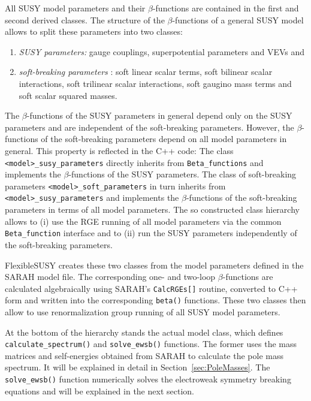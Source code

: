\documentclass[final,3p,11pt,pdflatex]{elsarticle}
\makeatletter
\newcommand{\fs}{FlexibleSUSY\@\xspace}
\newcommand{\code}[1]{\lstinline|#1|}  %
\newcommand{\secref}[1]{Section~\ref{#1}}
\makeatother
\begin{document}
All SUSY model parameters and their $\beta$-functions are contained in
the first and second derived classes.  The structure of the
$\beta$-functions of a general SUSY model
\cite{Jones:1974pg,Jones:1983vk,West:1984dg,Martin:1993yx,Yamada:1993ga,MV94,Fonseca:2011vn,Sperling:2013eva,Sperling:2013xqa}
allows to split these parameters into two classes:
%
\begin{enumerate}
\item \emph{SUSY parameters:} gauge couplings, superpotential
  parameters and VEVs and
\item \emph{soft-breaking parameters} \cite{Girardello:1981wz}: soft
  linear scalar terms, soft bilinear scalar interactions, soft
  trilinear scalar interactions, soft gaugino mass terms and soft
  scalar squared masses.
\end{enumerate}
%
The $\beta$-functions of the SUSY parameters in general depend only on
the SUSY parameters and are independent of the soft-breaking
parameters.  However, the $\beta$-functions of the soft-breaking
parameters depend on all model parameters in general.
%
This property is reflected in the C++ code: The class
\code{<model>_susy_parameters} directly inherits from
\code{Beta_functions} and implements the $\beta$-functions of the SUSY
parameters.  The class of soft-breaking parameters
\code{<model>_soft_parameters} in turn inherits from
\code{<model>_susy_parameters} and implements the $\beta$-functions of
the soft-breaking parameters in terms of all model parameters.  The so
constructed class hierarchy allows to (i) use the RGE running of all
model parameters via the common \code{Beta_function} interface and to
(ii) run the SUSY parameters independently of the soft-breaking
parameters.

\fs creates these two classes from the model parameters defined in the
SARAH model file.  The corresponding one- and two-loop
$\beta$-functions are calculated algebraically using SARAH's
\code{CalcRGEs[]} routine, converted to C++ form and written into the
corresponding \code{beta()} functions.  These two classes then allow
to use renormalization group running of all SUSY model parameters.

At the bottom of the hierarchy stands the actual model class, which
defines \code{calculate_spectrum()} and \code{solve_ewsb()} functions.
The former uses the mass matrices and self-energies obtained from
SARAH to calculate the pole mass spectrum.  It will be explained in
detail in \secref{sec:PoleMasses}.  The \code{solve_ewsb()} function
numerically solves the electroweak symmetry breaking equations and
will be explained in the next section.
\end{document}
